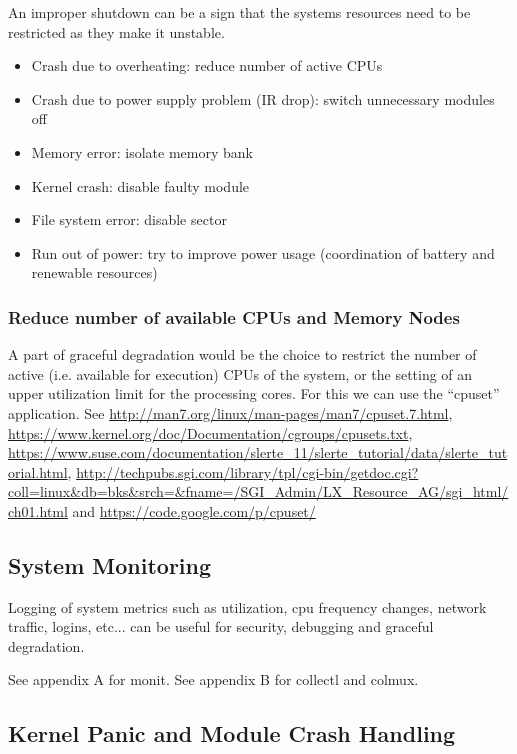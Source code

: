 An improper shutdown can be a sign that the systems resources need to be restricted as they make it unstable.

\begin{itemize}
 \item Crash due to overheating: reduce number of active CPUs
 \item Crash due to power supply problem (IR drop): switch unnecessary modules off
 \item Memory error: isolate memory bank
 \item Kernel crash: disable faulty module
 \item File system error: disable sector
 \item Run out of power: try to improve power usage (coordination of battery and renewable resources)
\end{itemize}




\subsubsection{Reduce number of available CPUs and Memory Nodes}

A part of graceful degradation would be the choice to restrict the number of active (i.e. available for execution) CPUs of the system, or the setting of an upper utilization limit for the processing cores. For this we can use the ``cpuset'' application. See \url{http://man7.org/linux/man-pages/man7/cpuset.7.html}, \url{https://www.kernel.org/doc/Documentation/cgroups/cpusets.txt}, \url{https://www.suse.com/documentation/slerte_11/slerte_tutorial/data/slerte_tutorial.html}, \url{http://techpubs.sgi.com/library/tpl/cgi-bin/getdoc.cgi?coll=linux&db=bks&srch=&fname=/SGI_Admin/LX_Resource_AG/sgi_html/ch01.html} and \url{https://code.google.com/p/cpuset/}

\subsection{System Monitoring}

Logging of system metrics such as utilization, cpu frequency changes, network traffic, logins, etc... can be useful for security, debugging and graceful degradation.

See appendix A for monit. See appendix B for collectl and colmux.

\subsection{Kernel Panic and Module Crash Handling}

